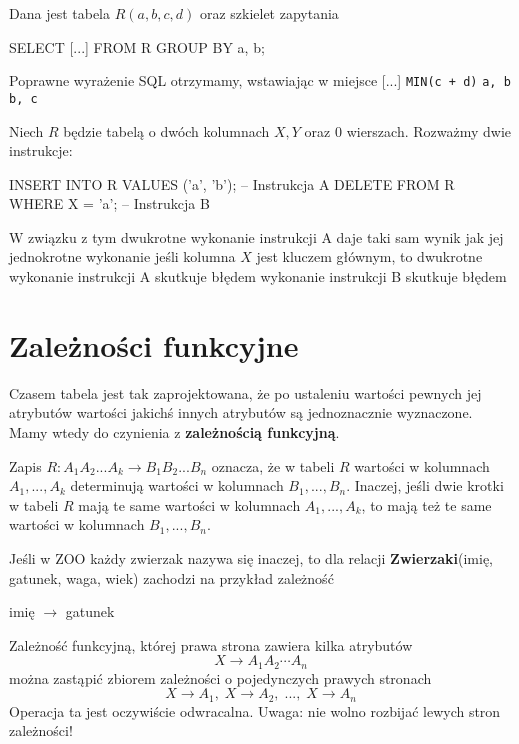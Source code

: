 \begin{problems}
    \prob Dana jest tabela $R(a,b,c,d)$ oraz szkielet zapytania 
    \begin{sql}
         SELECT [...]
         FROM R
         GROUP BY a, b;
    \end{sql}
    Poprawne wyrażenie SQL otrzymamy, wstawiając w miejsce [...]
    \answers
    {\texttt{MIN(c + d)}}
    {\texttt{a, b}}
    {\texttt{b, c}}

    \prob Niech $R$ będzie tabelą o dwóch kolumnach $X, Y$ oraz 0 wierszach. Rozważmy dwie instrukcje:
    \begin{sql}
        INSERT INTO R VALUES ('a', 'b');    -- Instrukcja A
        DELETE FROM R WHERE X = 'a';        -- Instrukcja B
    \end{sql}
    W związku z tym
    \answers
    {dwukrotne wykonanie instrukcji A daje taki sam wynik jak jej jednokrotne wykonanie}
    {jeśli kolumna $X$ jest kluczem głównym, to dwukrotne wykonanie instrukcji A skutkuje błędem}
    {wykonanie instrukcji B skutkuje błędem}
\end{problems}

\section{Zależności funkcyjne}
Czasem tabela jest tak zaprojektowana, że po ustaleniu wartości pewnych jej atrybutów wartości jakichś innych atrybutów są jednoznacznie wyznaczone. Mamy wtedy do czynienia z \textbf{zależnością funkcyjną}.

Zapis $R : A_1A_2...A_k \to B_1B_2...B_n$ oznacza, że w tabeli $R$ wartości w kolumnach $A_1, ..., A_k$ determinują wartości w kolumnach $B_1, ..., B_n$. Inaczej, jeśli dwie krotki w tabeli $R$ mają te same wartości w kolumnach $A_1, ..., A_k$, to mają też te same wartości w kolumnach $B_1, ..., B_n$.

\begin{example}
Jeśli w ZOO każdy zwierzak nazywa się inaczej, to dla relacji \textbf{Zwierzaki}(imię, gatunek, waga, wiek) zachodzi na przykład zależność
\begin{center}
    imię $\to$ gatunek
\end{center}
\end{example}

Zależność funkcyjną, której prawa strona zawiera kilka atrybutów
$$ X \to A_1 A_2 \cdots A_n $$
można zastąpić zbiorem zależności o pojedynczych prawych stronach
$$ X \to A_1,\; X \to A_2, \; ...,\; X \to A_n $$
Operacja ta jest oczywiście odwracalna. Uwaga: nie wolno rozbijać lewych stron zależności!
\bigskip


